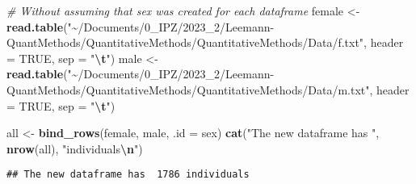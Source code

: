 \documentclass[
]{book}
\newenvironment{Shaded}{\begin{snugshade}}{\end{snugshade}}
\newcommand{\AttributeTok}[1]{\textcolor[rgb]{0.13,0.29,0.53}{#1}}
\newcommand{\CommentTok}[1]{\textcolor[rgb]{0.56,0.35,0.01}{\textit{#1}}}
\newcommand{\ConstantTok}[1]{\textcolor[rgb]{0.56,0.35,0.01}{#1}}
\newcommand{\DecValTok}[1]{\textcolor[rgb]{0.00,0.00,0.81}{#1}}
\newcommand{\FunctionTok}[1]{\textcolor[rgb]{0.13,0.29,0.53}{\textbf{#1}}}
\newcommand{\NormalTok}[1]{#1}
\newcommand{\OtherTok}[1]{\textcolor[rgb]{0.56,0.35,0.01}{#1}}
\newcommand{\SpecialCharTok}[1]{\textcolor[rgb]{0.81,0.36,0.00}{\textbf{#1}}}
\newcommand{\StringTok}[1]{\textcolor[rgb]{0.31,0.60,0.02}{#1}}
\begin{document}
\begin{Shaded}
\begin{Highlighting}[]
\CommentTok{\# Without assuming that \textasciigrave{}sex\textasciigrave{} was created for each dataframe}
\NormalTok{female }\OtherTok{\textless{}{-}} \FunctionTok{read.table}\NormalTok{(}\StringTok{"\textasciitilde{}/Documents/0\_IPZ/2023\_2/Leemann{-}QuantMethods/QuantitativeMethods/QuantitativeMethods/Data/f.txt"}\NormalTok{, }\AttributeTok{header =} \ConstantTok{TRUE}\NormalTok{, }\AttributeTok{sep =} \StringTok{"}\SpecialCharTok{\textbackslash{}t}\StringTok{"}\NormalTok{)}
\NormalTok{male }\OtherTok{\textless{}{-}} \FunctionTok{read.table}\NormalTok{(}\StringTok{"\textasciitilde{}/Documents/0\_IPZ/2023\_2/Leemann{-}QuantMethods/QuantitativeMethods/QuantitativeMethods/Data/m.txt"}\NormalTok{, }\AttributeTok{header =} \ConstantTok{TRUE}\NormalTok{, }\AttributeTok{sep =} \StringTok{"}\SpecialCharTok{\textbackslash{}t}\StringTok{"}\NormalTok{)}

\NormalTok{all }\OtherTok{\textless{}{-}} \FunctionTok{bind\_rows}\NormalTok{(female, male, }\AttributeTok{.id =} \StringTok{\textquotesingle{}sex\textquotesingle{}}\NormalTok{)}
\FunctionTok{cat}\NormalTok{(}\StringTok{"The new dataframe has "}\NormalTok{, }\FunctionTok{nrow}\NormalTok{(all), }\StringTok{"individuals}\SpecialCharTok{\textbackslash{}n}\StringTok{"}\NormalTok{)}
\end{Highlighting}
\end{Shaded}

\begin{verbatim}
## The new dataframe has  1786 individuals
\end{verbatim}

\begin{Shaded}
\end{Shaded}
\end{document}
